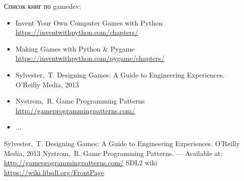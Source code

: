 Список книг по gamedev:
\begin{itemize}
    \item Invent Your Own Computer Games with Python \url{https://inventwithpython.com/chapters/}
    \item Making Games with Python \& Pygame \url{https://inventwithpython.com/pygame/chapters/}
    \item Sylvester,~T. Designing Games: A Guide to Engineering Experiences. O'Reilly Media, 2013
    \item Nystrom,~R. Game Programming Patterns \url{http://gameprogrammingpatterns.com/}
    \item ...
\end{itemize}

\renewcommand{\bibname}{Список используемой литературы}
\begin{thebibliography}{10}
     Sylvester,~T. Designing Games: A Guide to Engineering Experiences. O'Reilly Media, 2013 
     Nystrom,~R. Game Programming Patterns. --- Available at: 
        \url{http://gameprogrammingpatterns.com/}
     SDL2 wiki \url{https://wiki.libsdl.org/FrontPage}
\end{thebibliography}